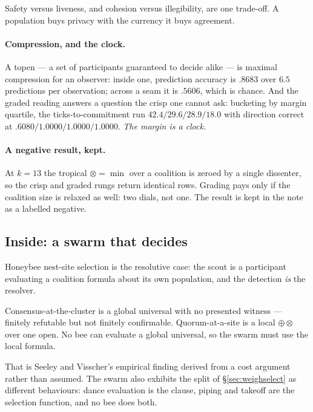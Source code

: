 \begin{principle}
Safety versus liveness, and cohesion versus illegibility, are one trade-off. A
population buys privacy with the currency it buys agreement.
\end{principle}

\paragraph{Compression, and the clock.} A topen --- a set of participants
guaranteed to decide alike --- is maximal compression for an observer: inside one,
prediction accuracy is $.8683$ over $6.5$ predictions per observation; across a
seam it is $.5606$, which is chance. And the graded reading answers a question the
crisp one cannot ask: bucketing by margin quartile, the ticks-to-commitment run
$42.4/29.6/28.9/18.0$ with direction correct at
$.6080/1.0000/1.0000/1.0000$. \emph{The margin is a clock.}

\paragraph{A negative result, kept.} At $k=13$ the tropical $\otimes = \min$ over
a coalition is zeroed by a single dissenter, so the crisp and graded rungs return
identical rows. Grading pays only if the coalition size is relaxed as well: two
dials, not one. The result is kept in the note as a labelled negative.

\subsection{Inside: a swarm that decides}

Honeybee nest-site selection \cite{Seeley10,SeeleyVisscher04} is the resolutive
case: the scout is a participant evaluating a coalition formula about its own
population, and the detection \emph{is} the resolver.

\begin{proposition}
\label{prop:quorumforced}
Consensus-at-the-cluster is a global universal with no presented witness ---
finitely refutable but not finitely confirmable. Quorum-at-a-site is a local
$\oplus\otimes$ over one open. No bee can evaluate a global universal, so the
swarm must use the local formula.
\end{proposition}

That is Seeley and Visscher's empirical finding \cite{SeeleyVisscher04} derived
from a cost argument rather than assumed. The swarm also exhibits the split of
\S\ref{sec:weighselect} as different behaviours: dance evaluation is the clause,
piping and takeoff are the selection function, and no bee does both.

